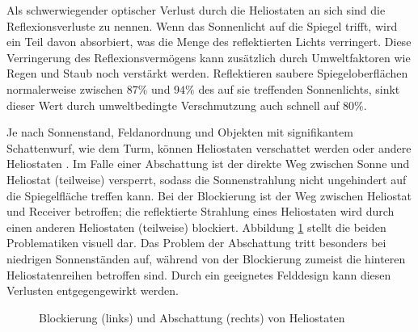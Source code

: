 Als schwerwiegender optischer Verlust durch die Heliostaten an sich sind die Reflexionsverluste zu nennen.
Wenn das Sonnenlicht auf die Spiegel trifft, wird ein Teil davon absorbiert, was die Menge des reflektierten Lichts verringert.
Diese Verringerung des Reflexionsvermögens kann zusätzlich durch Umweltfaktoren wie Regen und Staub noch verstärkt werden.
Reflektieren saubere Spiegeloberflächen normalerweise zwischen $87 \%$ und $94 \%$ des auf sie treffenden Sonnenlichts, sinkt dieser Wert durch umweltbedingte Verschmutzung auch schnell auf $80 \%$. \cite[S. 14]{DissBelhomme}

Je nach Sonnenstand, Feldanordnung und Objekten mit signifikantem Schattenwurf, wie dem Turm, können Heliostaten verschattet werden oder andere Heliostaten .
Im Falle einer Abschattung ist der direkte Weg zwischen Sonne und Heliostat (teilweise) versperrt, sodass die Sonnenstrahlung nicht ungehindert auf die Spiegelfläche treffen kann.
Bei der Blockierung ist der Weg zwischen Heliostat und Receiver betroffen; die reflektierte Strahlung eines Heliostaten wird durch einen anderen Heliostaten (teilweise) blockiert.
Abbildung \ref{fig_AbschattungBlockieren} stellt die beiden Problematiken visuell dar.
Das Problem der Abschattung tritt besonders bei niedrigen Sonnenständen auf, während von der Blockierung zumeist die hinteren Heliostatenreihen betroffen sind.
Durch ein geeignetes Felddesign kann diesen Verlusten entgegengewirkt werden. \cite[S. 686]{Wei2014}

\begin{figure}[h!]
    \centering
    \setlength{\fboxsep}{1pt}
    \setlength{\fboxrule}{1pt}
\caption[Blockierung und Abschattung von Heliostaten]{Blockierung (links) und Abschattung (rechts) von Heliostaten \cite[S. 15]{DissBelhomme}}
    \label{fig_AbschattungBlockieren}
\end{figure}

